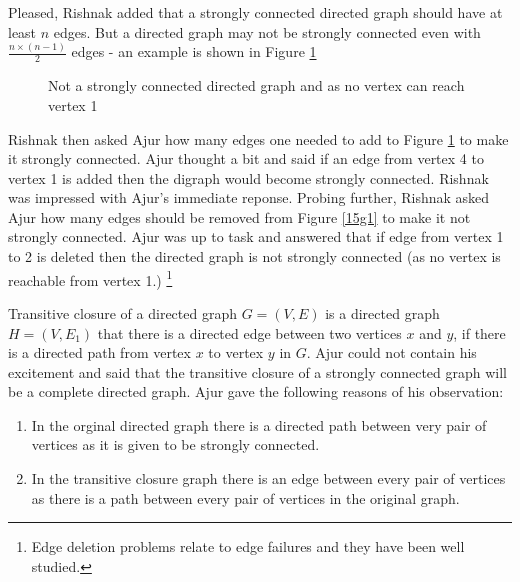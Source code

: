 Pleased, Rishnak added that a strongly connected directed graph should have at least $n$ edges. But a directed graph may not be strongly connected even with $\frac{n \times (n-1)}{2}$ edges - an example is shown in Figure \ref{15g3}
\begin{figure}
\begin{center}
\caption{ Not a strongly connected directed graph and as no vertex can reach vertex 1}\label{15g3}
\end{center}
\end{figure}

Rishnak then asked Ajur how many edges one needed to add to Figure \ref{15g3} to make it strongly connected. Ajur thought a bit and said if an edge from vertex 4 to vertex 1 is added then the digraph would become strongly connected. Rishnak was impressed with Ajur's immediate reponse. Probing further, Rishnak asked Ajur how many edges should be removed from Figure \ref{15g1} to make it not strongly connected. Ajur was up to task and answered that if edge from vertex 1 to 2 is deleted then the directed graph is not strongly connected (as no vertex is reachable from vertex 1.) \footnote{Edge deletion problems relate to edge failures and they have been well studied.}

Transitive closure of a directed graph $G=(V,E)$ is a directed graph $H=(V,E_1)$ that there is a directed edge between two vertices $x$ and $y$, if there is a directed path from vertex $x$ to vertex $y$ in $G$. Ajur could not contain his excitement and said that the transitive closure of a strongly connected graph will be a complete directed graph. Ajur gave the following reasons of his observation:
\begin{enumerate}
    \item In the orginal directed graph there is a directed path between very pair of vertices as it is given to be strongly connected.
    \item In the transitive closure graph there is an edge between every pair of vertices as there is a path between every pair of vertices in the original graph.
\end{enumerate}

